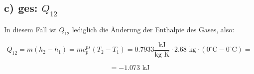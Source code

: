 \subsection*{c) ges: $Q_{12}$}

In diesem Fall ist $Q_{12}$ lediglich die Änderung der Enthalpie des Gases, also:

\[
Q_{12} = m(h_2 - h_1) = m c_p^{ps} (T_2 - T_1) = 0.7933 \frac{\text{kJ}}{\text{kg K}} \cdot 2.68 \text{ kg} \cdot (0^\circ \text{C} - 0^\circ \text{C}) = 
\]

\[
= -1.073 \text{ kJ}
\]